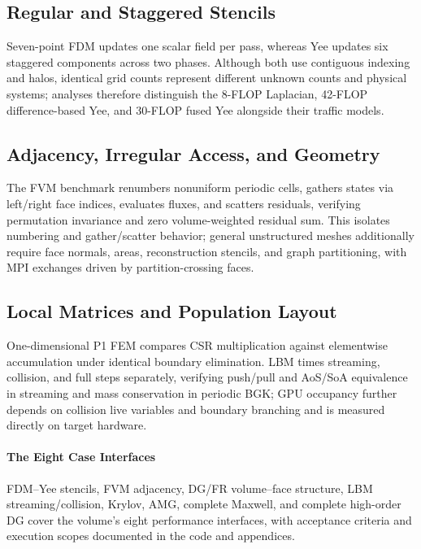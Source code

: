 \subsection{Regular and Staggered Stencils}
Seven-point FDM updates one scalar field per pass, whereas Yee updates six staggered components across two phases. Although both use contiguous indexing and halos, identical grid counts represent different unknown counts and physical systems; analyses therefore distinguish the 8-FLOP Laplacian, 42-FLOP difference-based Yee, and 30-FLOP fused Yee alongside their traffic models.
\subsection{Adjacency, Irregular Access, and Geometry}
The FVM benchmark renumbers nonuniform periodic cells, gathers states via left/right face indices, evaluates fluxes, and scatters residuals, verifying permutation invariance and zero volume-weighted residual sum. This isolates numbering and gather/scatter behavior; general unstructured meshes additionally require face normals, areas, reconstruction stencils, and graph partitioning, with MPI exchanges driven by partition-crossing faces.
\subsection{Local Matrices and Population Layout}
One-dimensional P1 FEM compares CSR multiplication against elementwise accumulation under identical boundary elimination. LBM times streaming, collision, and full steps separately, verifying push/pull and AoS/SoA equivalence in streaming and mass conservation in periodic BGK; GPU occupancy further depends on collision live variables and boundary branching and is measured directly on target hardware.
\paragraph{The Eight Case Interfaces}
FDM--Yee stencils, FVM adjacency, DG/FR volume--face structure, LBM streaming/collision, Krylov, AMG, complete Maxwell, and complete high-order DG cover the volume's eight performance interfaces, with acceptance criteria and execution scopes documented in the code and appendices.
